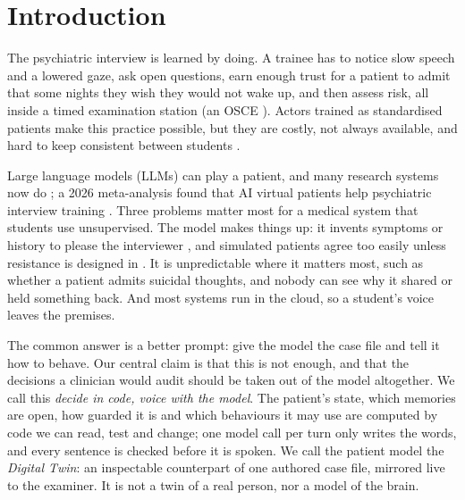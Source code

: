\documentclass[sn-basic,Numbered]{sn-jnl}
\begin{document}
\section{Introduction}\label{sec:intro}
The psychiatric interview is learned by doing. A trainee has to notice slow speech and a lowered gaze, ask open questions, earn enough trust
for a patient to admit that some nights they wish they would not wake up, and then assess risk, all inside a timed examination station (an
OSCE \cite{harden1975osce}). Actors trained as standardised patients make this practice possible, but they are costly, not always available,
and hard to keep consistent between students \cite{piot2021simulation}.

Large language models (LLMs) can play a patient, and many research systems now do
\cite{chen2023llmempowered,wang2024patient,lee2025psyche,sabour2026patientact,sabour2026patienthub,louie2024roleplaydoh}; a 2026
meta-analysis found that AI virtual patients help psychiatric interview training \cite{kilincel2026meta}. Three problems matter most for a
medical system that students use unsupervised. The model makes things up: it invents symptoms or history to please the interviewer
\cite{chen2023llmempowered}, and simulated patients agree too easily unless resistance is designed in \cite{steenstra2025scaffolding,lee2025psyche}.
It is unpredictable where it matters most, such as whether a patient admits suicidal thoughts, and nobody can see why it shared or held
something back. And most systems run in the cloud, so a student's voice leaves the premises.

The common answer is a better prompt: give the model the case file and tell it how to behave. Our central claim is that this is not enough,
and that the decisions a clinician would audit should be taken out of the model altogether. We call this \emph{decide in code, voice with the
model}. The patient's state, which memories are open, how guarded it is and which behaviours it may use are computed by code we can read,
test and change; one model call per turn only writes the words, and every sentence is checked before it is spoken. We call the patient model
the \emph{Digital Twin}: an inspectable counterpart of one authored case file, mirrored live to the examiner. It is not a twin of a real
person, nor a model of the brain.
\end{document}
